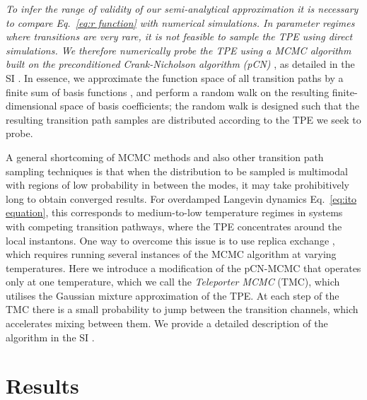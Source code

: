\textit{\emph{ To infer the range of
validity of our semi-analytical approximation it is necessary to compare
Eq.~\eqref{eq:r function} with numerical simulations. In parameter
regimes where transitions are very rare, it is not feasible to sample
the TPE using direct simulations. We therefore numerically probe the
TPE using a MCMC algorithm built on the }}\textit{preconditioned Crank-Nicholson
algorithm }\textit{\emph{(pCN) }}\citep{cotterMCMCMethodsFunctions2013,beskosMCMCMETHODSDIFFUSION2008,hairerSpectralGapsMetropolis2014},
as detailed in the SI \citep{note:SI}. In essence, we approximate
the function space of all transition paths by a finite sum of basis
functions \citep{kosambiStatisticsFunctionSpace1943,karhunenUberLineareMethoden1947,loeveProbabilityTheory1977},
and perform a random walk on the resulting finite-dimensional space
of basis coefficients; the random walk is designed such that the resulting
transition path samples are distributed according to the TPE we seek
to probe.

A general shortcoming of MCMC methods and also other transition path
sampling techniques \citep{bolhuisTransitionPathSampling2002,bolhuisTransitionPathSampling,dellagoTransitionPathSampling1998,dellagoEfficientTransitionPath1998a,fujisakiOnsagerMachlupActionbased2010}
is that when the distribution to be sampled is multimodal with regions
of low probability in between the modes, it may take prohibitively
long to obtain converged results. For overdamped Langevin dynamics
Eq.~\eqref{eq:ito equation}, this corresponds to medium-to-low temperature
regimes in systems with competing transition pathways, where the TPE
concentrates around the local instantons. One way to overcome this
issue is to use replica exchange \citep{fujisakiOnsagerMachlupActionbased2010},
which requires running several instances of the MCMC algorithm at
varying temperatures. Here we introduce a modification of the pCN-MCMC
that operates only at one temperature, which we call the \emph{Teleporter
MCMC }(TMC), which utilises the Gaussian mixture approximation of
the TPE. At each step of the TMC there is a small probability to jump
between the transition channels, which accelerates mixing between
them. We provide a detailed description of the algorithm in the SI
\citep{note:SI}.

\section{Results}

